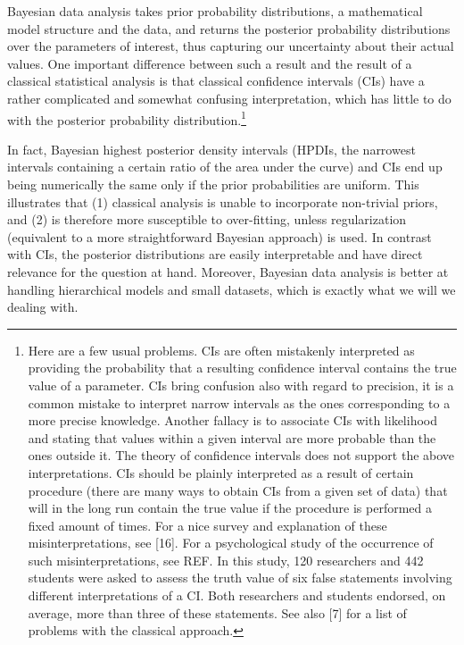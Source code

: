 \documentclass[
  12pt,
  dvipsnames,enabledeprecatedfontcommands]{scrartcl}
\begin{document}
Bayesian data analysis takes prior probability distributions, a
mathematical model structure and the data, and returns the posterior
probability distributions over the parameters of interest, thus
capturing our uncertainty about their actual values. One important
difference between such a result and the result of a classical
statistical analysis is that classical confidence intervals (CIs) have a
rather complicated and somewhat confusing interpretation, which has
little to do with the posterior probability distribution.\footnote{Here
  are a few usual problems. CIs are often mistakenly interpreted as
  providing the probability that a resulting confidence interval
  contains the true value of a parameter. CIs bring confusion also with
  regard to precision, it is a common mistake to interpret narrow
  intervals as the ones corresponding to a more precise knowledge.
  Another fallacy is to associate CIs with likelihood and stating that
  values within a given interval are more probable than the ones outside
  it. The theory of confidence intervals does not support the above
  interpretations. CIs should be plainly interpreted as a result of
  certain procedure (there are many ways to obtain CIs from a given set
  of data) that will in the long run contain the true value if the
  procedure is performed a fixed amount of times. For a nice survey and
  explanation of these misinterpretations, see {[}16{]}. For a
  psychological study of the occurrence of such misinterpretations, see
  REF. In this study, 120 researchers and 442 students were asked to
  assess the truth value of six false statements involving different
  interpretations of a CI. Both researchers and students endorsed, on
  average, more than three of these statements. See also {[}7{]} for a
  list of problems with the classical approach.}

In fact, Bayesian highest posterior density intervals (HPDIs, the
narrowest intervals containing a certain ratio of the area under the
curve) and CIs end up being numerically the same only if the prior
probabilities are uniform. This illustrates that (1) classical analysis
is unable to incorporate non-trivial priors, and (2) is therefore more
susceptible to over-fitting, unless regularization (equivalent to a more
straightforward Bayesian approach) is used. In contrast with CIs, the
posterior distributions are easily interpretable and have direct
relevance for the question at hand. Moreover, Bayesian data analysis is
better at handling hierarchical models and small datasets, which is
exactly what we will we dealing with.
\end{document}
